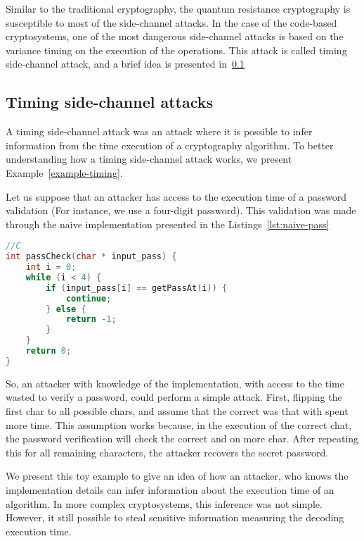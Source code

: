 Similar to the traditional cryptography, the quantum resistance cryptography is susceptible to most of the side-channel attacks. In the case of the code-based cryptosystems, one of the most dangerous side-channel attacks is based on the variance timing on the execution of the operations. This attack is called timing side-channel attack, and a brief idea is presented in~\ref{sub:timing-attack}

\subsection{Timing side-channel attacks}\label{sub:timing-attack}
A timing side-channel attack was an attack where it is possible to infer information from the time execution of a cryptography algorithm. To better understanding how a timing side-channel attack works, we present Example~\ref{example-timing}. 

\begin{example}\label{example-timing}
Let us suppose that an attacker has access to the execution time of a password validation (For instance, we use a four-digit password). This validation was made through the naive implementation presented in the Listings~\ref{lst:naive-pass}

\begin{lstlisting}[caption={Naive implementation of password check },label={lst:naive-pass},language=C]
//C
int passCheck(char * input_pass) {
    int i = 0;
    while (i < 4) {
        if (input_pass[i] == getPassAt(i)) {
            continue;
        } else {
            return -1;
        }
    }
    return 0;
}
\end{lstlisting}
So, an attacker with knowledge of the implementation, with access to the time wasted to verify a password, could perform a simple attack. First, flipping the first char to all possible chars, and assume that the correct was that with spent more time. This assumption works because, in the execution of the correct chat, the password verification will check the correct and on more char. After repeating this for all remaining characters, the attacker recovers the secret password.
\end{example}

We present this toy example to give an idea of how an attacker, who knows the implementation details can infer information about the execution time of an algorithm. In more complex cryptosystems, this inference was not simple. However, it still possible to steal sensitive information measuring the decoding execution time.

